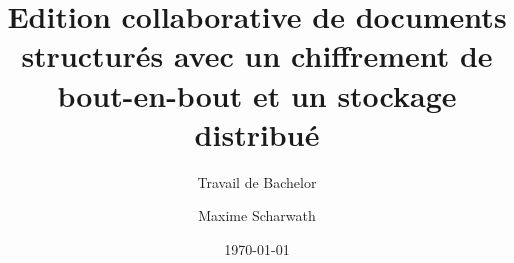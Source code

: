 \author{Maxime Scharwath}


\title{Edition collaborative de documents structurés avec un chiffrement de bout-en-bout et un stockage distribué}

\subtitle{Travail de Bachelor}


\date{\today}


